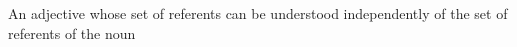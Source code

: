 An adjective whose set of referents can be understood independently of the set of referents of the noun
